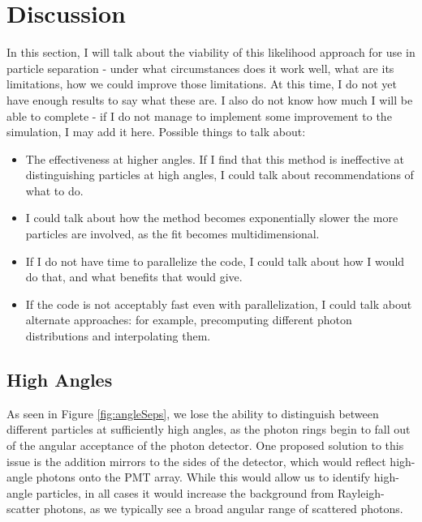 
\chapter{Discussion}
\label{ch:Discussion}




In this section, I will talk about the viability of this likelihood approach for use in particle separation - under what circumstances does it work well, what are its limitations, how we could improve those limitations. At this time, I do not yet have enough results to say what these are. I also do not know how much I will be able to complete - if I do not manage to implement some improvement to the simulation, I may add it here. Possible things to talk about:
\begin{itemize}
\item The effectiveness at higher angles. If I find that this method is ineffective at distinguishing particles at high angles, I could talk about recommendations of what to do.
\item I could talk about how the method becomes exponentially slower the more particles are involved, as the fit becomes multidimensional.
\item If I do not have time to parallelize the code, I could talk about how I would do that, and what benefits that would give.
\item If the code is not acceptably fast even with parallelization, I could talk about alternate approaches: for example, precomputing different photon distributions and interpolating them.
\end{itemize}

\section{High Angles}
As seen in Figure \ref{fig:angleSeps}, we lose the ability to distinguish between different particles at sufficiently high angles, as the photon rings begin to fall out of the angular acceptance of the photon detector.
One proposed solution to this issue is the addition mirrors to the sides of the detector, which would reflect high-angle photons onto the PMT array. 
While this would allow us to identify high-angle particles, in all cases it would increase the background from Rayleigh-scatter photons, as we typically see a broad angular range of scattered photons.

